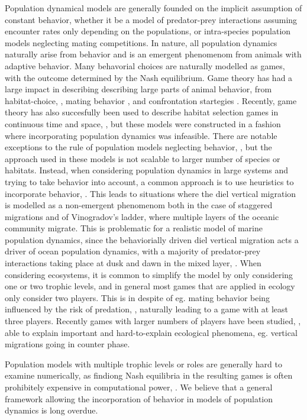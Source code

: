 Population dynamical models are generally founded on the implicit assumption of constant behavior, whether it be a model of predator-prey interactions assuming encounter rates only depending on the populations, or intra-species population models neglecting mating competitions. In nature, all population dynamics naturally arise from behavior and is an emergent phenomenom from animals with adaptive behavior. Many behavorial choices are naturally modelled as games, with the outcome determined by the Nash equilibrium. Game theory has had a large impact in describing describing large parts of animal behavior,  from habitat-choice, \citep{idealfreedistribution}, mating behavior  \citep{battleofthesexes}, and confrontation startegies \citep{hawkdove}. Recently, game theory has also succesfully been used to describe habitat selection games in continuous time and space, \citep{jerome,verticalmigration}, but these models were constructed in a fashion where incorporating population dynamics was infeasible. There are notable exceptions to the rule of population models neglecting behavior, \citep{Krivan1998,genkai2007macrophyte, sadowski2019predator}, but the approach used in these models is not scalable to larger number of species or habitats. Instead, when considering population dynamics in large systems and trying to take behavior into account, a common approach is to use heuristics to incorporate behavior, \citep{ho2019}. This leads to situations where the diel vertical migration is modelled as a non-emergent phenomenom \citep{danielpaper} both in the case of staggered migrations and of  Vinogradov's ladder, where multiple layers of the oceanic community migrate. This is problematic for a realistic model of marine population dynamics, since the behaviorially driven diel vertical migration acts a driver of ocean population dynamics, with a majority of predator-prey interactions taking place at dusk and dawn in the mixed layer,  \citep{benoit2014critical}. When considering ecosystems, it is common to simplify the model by only considering one or two trophic levels, and in general most games that are applied in ecology only consider two players. This is in despite of eg. mating behavior being influenced by the risk of predation, \citep{deer,birds}, naturally leading to a game with at least three players. Recently games with larger numbers of players have been studied, \citep{pinti2019trophic}, able to explain important and hard-to-explain ecological phenomena, eg. vertical migrations going in counter phase.

Population models with multiple trophic levels or roles are generally hard to examine numerically, as findiong Nash equilibria in the resulting games is often prohibitely expensive in computational power, \citep{empirical_trait,abrams2010implications,pinti2019trophic}. We believe that a general framework allowing the incorporation of behavior in models of population dynamics is long overdue.


